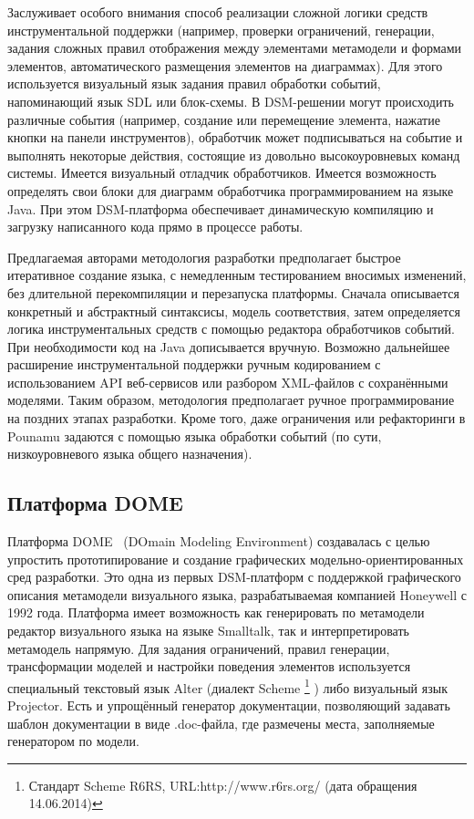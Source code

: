 Заслуживает особого внимания способ реализации сложной логики средств инструментальной 
поддержки (например, проверки ограничений, генерации, задания сложных правил отображения 
между элементами метамодели и формами элементов, автоматического размещения элементов 
на диаграммах). Для этого используется визуальный язык задания правил обработки событий, 
напоминающий язык SDL или блок-схемы. В DSM-решении могут происходить различные события 
(например, создание или перемещение элемента, нажатие кнопки на панели инструментов), 
обработчик может подписываться на событие и выполнять некоторые действия, состоящие из 
довольно высокоуровневых команд системы. Имеется визуальный отладчик обработчиков. 
Имеется возможность определять свои блоки для диаграмм обработчика программированием 
на языке Java. При этом DSM-платформа обеспечивает динамическую компиляцию и загрузку 
написанного кода прямо в процессе работы.

Предлагаемая авторами методология разработки предполагает быстрое итеративное создание 
языка, с немедленным тестированием вносимых изменений, без длительной перекомпиляции 
и перезапуска платформы. Сначала описывается конкретный и абстрактный синтаксисы, 
модель соответствия, затем определяется логика инструментальных средств с помощью 
редактора обработчиков событий. При необходимости код на Java дописывается вручную. 
Возможно дальнейшее расширение инструментальной поддержки ручным кодированием с использованием 
API веб-сервисов или разбором XML-файлов с сохранёнными моделями. Таким образом, методология 
предполагает ручное программирование на поздних этапах разработки. Кроме того, даже 
ограничения или рефакторинги в Pounamu задаются с помощью языка обработки событий 
(по сути, низкоуровневого языка общего назначения).

\subsection{Платформа DOME}
Платформа DOME~\cite{engstrom2000building, guide1999honeywell} (DOmain Modeling Environment) создавалась с целью упростить
прототипирование и создание графических модельно-ориентированных сред разработки. Это одна из первых
DSM-платформ с поддержкой графического описания метамодели визуального языка, разрабатываемая 
компанией Honeywell с 1992 года. Платформа имеет возможность как генерировать по метамодели редактор
визуального языка на языке Smalltalk, так и интерпретировать метамодель напрямую. Для
задания ограничений, правил генерации, трансформации моделей и настройки поведения элементов 
используется специальный текстовый язык Alter (диалект Scheme%
\footnote{Стандарт Scheme R6RS, URL:http://www.r6rs.org/ (дата обращения 14.06.2014)}%
) либо визуальный язык Projector. Есть и упрощённый генератор документации, позволяющий задавать шаблон документации в виде
.doc-файла, где размечены места, заполняемые генератором по модели.

